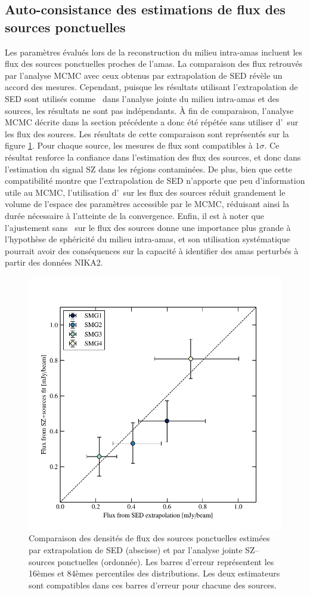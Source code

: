 \subsection{Auto-consistance des estimations de flux des sources ponctuelles}

Les paramètres évalués lors de la reconstruction du milieu intra-amas incluent les flux des sources ponctuelles proches de l'amas.
La comparaison des flux retrouvés par l'analyse MCMC avec ceux obtenus par extrapolation de SED révèle un accord des mesures.
Cependant, puisque les résultats utilisant l'extrapolation de SED sont utilisés comme \prior\ dans l'analyse jointe du milieu intra-amas et des sources, les résultats ne sont pas indépendants.
À fin de comparaison, l'analyse MCMC décrite dans la section précédente a donc été répétée sans utiliser d'\prior\ sur les flux des sources.
Les résultats de cette comparaison sont représentés sur la figure \ref{fig:act:pscomp}.
Pour chaque source, les mesures de flux sont compatibles à $1\sigma$.
Ce résultat renforce la confiance dans l'estimation des flux des sources, et donc dans l'estimation du signal SZ dans les régions contaminées.
De plus, bien que cette compatibilité montre que l'extrapolation de SED n'apporte que peu d'information utile au MCMC, l'utilisation d'\prior\ sur les flux des sources réduit grandement le volume de l'espace des paramètres accessible par le MCMC, réduisant ainsi la durée nécessaire à l'atteinte de la convergence.
Enfin, il est à noter que l'ajustement sans \prior\ sur le flux des sources donne une importance plus grande à l'hypothèse de sphéricité du milieu intra-amas, et son utilisation systématique pourrait avoir des conséquences sur la capacité à identifier des amas perturbés à partir des données NIKA2.

\begin{figure}
    \centering
    \includegraphics[width=0.5\linewidth, trim={.35cm .5cm .35cm 1.4cm}, clip]{Figures/Chap_actj0215/ps_fluxes_comp.pdf}
    \caption{%
        Comparaison des densités de flux des sources ponctuelles estimées par extrapolation de SED (abscisse) et par l'analyse jointe SZ--sources ponctuelles (ordonnée).
        Les barres d'erreur représentent les 16èmes et 84èmes percentiles des distributions.
        Les deux estimateurs sont compatibles dans ces barres d'erreur pour chacune des sources.
    }
    \label{fig:act:pscomp}
\end{figure}


